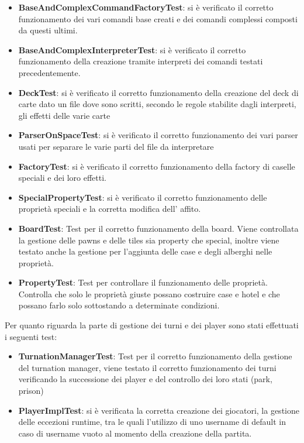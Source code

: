 \begin{itemize}
    \item \textbf{BaseAndComplexCommandFactoryTest}: si è verificato il corretto funzionamento dei vari comandi base creati e dei comandi complessi composti da questi ultimi.
    \item \textbf{BaseAndComplexInterpreterTest}: si è verificato il corretto funzionamento della creazione tramite interpreti dei comandi testati precedentemente.
    \item \textbf{DeckTest}: si è verificato il corretto funzionamento della creazione del deck di carte dato un file dove sono scritti, secondo le regole stabilite dagli interpreti, gli effetti delle varie carte
    \item \textbf{ParserOnSpaceTest}: si è verificato il corretto funzionamento dei vari parser usati per separare le varie parti del file da interpretare
    \item \textbf{FactoryTest}: si è verificato il corretto funzionamento della factory di caselle speciali e dei loro effetti. 
    \item \textbf{SpecialPropertyTest}: si è verificato il corretto funzionamento delle proprietà speciali e la corretta modifica dell' affito.
    \item \textbf{BoardTest}: Test per il corretto funzionamento della board. Viene controllata la gestione delle pawns e delle tiles sia property che special, inoltre viene testato anche la gestione per l'aggiunta delle case e degli alberghi nelle proprietà.
    \item \textbf{PropertyTest}: Test per controllare il funzionamento delle proprietà. Controlla che solo le proprietà giuste possano costruire case e hotel e che possano farlo solo sottostando a determinate condizioni.
\end{itemize}
Per quanto riguarda la parte di gestione dei turni e dei player sono stati effettuati i seguenti test:\newline
\begin{itemize}
    \item \textbf{TurnationManagerTest}: Test per il corretto funzionamento della gestione del turnation manager, viene testato il corretto funzionamento dei turni verificando la successione dei player e del controllo dei loro stati (park, prison)
    \item \textbf{PlayerImplTest}: si è verificata la corretta creazione dei giocatori, la gestione delle eccezioni runtime, tra le quali l'utilizzo di uno username di default in caso di username vuoto al momento della creazione della partita.
\end{itemize}
